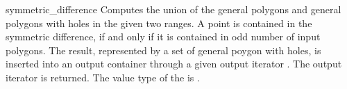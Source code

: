 \begin{ccRefFunction}{symmetric_difference}
{Computes the union of the general polygons and general polygons
with holes in the given two ranges. A point is contained in the 
symmetric difference, if and only if it is contained in odd number of 
input polygons. The result, represented by a set of general poygon with 
holes, is inserted into an output container through a given output 
iterator . The output iterator is returned. The value type of 
the  is .}

\ccSeeAlso
{}\\
\\
\\

\end{ccRefFunction}

\ccRefPageEnd
